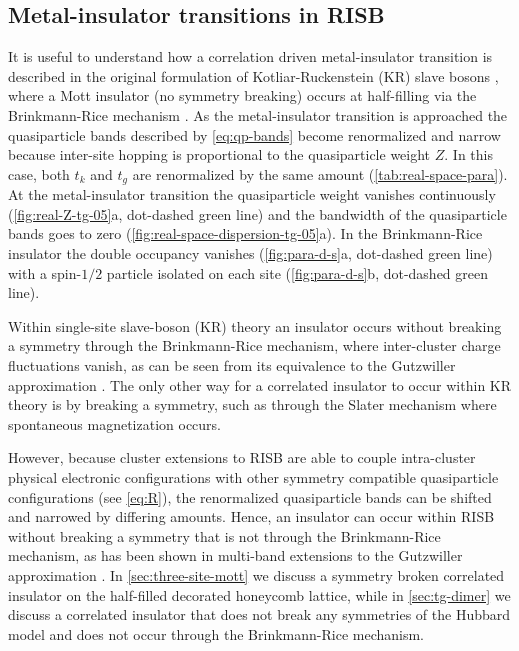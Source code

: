 \documentclass[reprint,aps,prb,amsmath,amssymb]{revtex4-2}
\begin{document}
\subsection{Metal-insulator transitions in RISB}

It is useful to understand how a correlation driven metal-insulator transition is described in the original formulation of Kotliar-Ruckenstein (KR) slave bosons \cite{Kotliar1986}, where a Mott insulator (no symmetry breaking) occurs at half-filling via the Brinkmann-Rice mechanism \cite{Brinkman1970}. As the metal-insulator transition is approached the quasiparticle bands described by \cref{eq:qp-bands} become renormalized and narrow because inter-site hopping is proportional to the quasiparticle weight $Z$. In this case, both $t_k$ and $t_g$ are renormalized by the same amount (\cref{tab:real-space-para}). At the metal-insulator transition the quasiparticle weight vanishes continuously (\cref{fig:real-Z-tg-05}a, dot-dashed green line) and the bandwidth of the quasiparticle bands goes to zero (\cref{fig:real-space-dispersion-tg-05}a). In the Brinkmann-Rice insulator the double occupancy vanishes (\cref{fig:para-d-s}a, dot-dashed green line) with a spin-$1/2$ particle isolated on each site (\cref{fig:para-d-s}b, dot-dashed green line).

Within single-site slave-boson (KR) theory an insulator occurs without breaking a symmetry through the Brinkmann-Rice mechanism, where inter-cluster charge fluctuations vanish, as can be seen from its equivalence to the Gutzwiller approximation \cite{Bunemann2007}. The only other way for a correlated insulator to occur within KR theory is by breaking a symmetry, such as through the Slater mechanism where spontaneous magnetization occurs.

However, because cluster extensions to RISB are able to couple intra-cluster physical electronic configurations with other symmetry compatible quasiparticle configurations (see \cref{eq:R}), the renormalized quasiparticle bands can be shifted and narrowed by differing amounts. Hence, an insulator can occur within RISB without breaking a symmetry that is not through the Brinkmann-Rice mechanism, as has been shown in multi-band extensions to the Gutzwiller approximation \cite{Fabrizio2007}. In \cref{sec:three-site-mott} we discuss a symmetry broken correlated insulator on the half-filled decorated honeycomb lattice, while in \cref{sec:tg-dimer} we discuss a correlated insulator that does not break any symmetries of the Hubbard model and does not occur through the Brinkmann-Rice mechanism.
\end{document}
